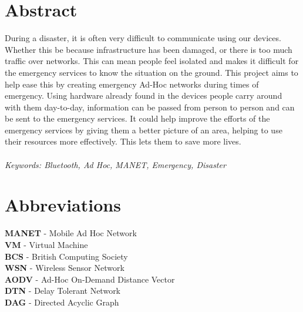 \documentclass{report}
\begin{document}
\chapter*{Abstract}

During a disaster, it is often very difficult to communicate using our devices. Whether this be because 
infrastructure has been damaged, or there is too much traffic over networks. This can mean people feel 
isolated and makes it difficult for the emergency services to know the situation on the ground. This 
project aims to help ease this by creating emergency Ad-Hoc networks during times of emergency. Using 
hardware already found in the devices people carry around with them day-to-day, information can be 
passed from person to person and can be sent to the emergency services. It could help improve the efforts of the emergency services by giving them a better picture of an area, helping to use their resources more effectively. This lets them to save more lives.
\\
\\
\textit{Keywords: Bluetooth, Ad Hoc, MANET, Emergency, Disaster}



\chapter*{Abbreviations}

\textbf{MANET} - Mobile Ad Hoc Network\\
\textbf{VM} - Virtual Machine\\
\textbf{BCS} - British Computing Society\\
\textbf{WSN} - Wireless Sensor Network\\
\textbf{AODV} - Ad-Hoc On-Demand Distance Vector\\
\textbf{DTN} - Delay Tolerant Network\\
\textbf{DAG} - Directed Acyclic Graph\\



\tableofcontents{}     
\end{document}
